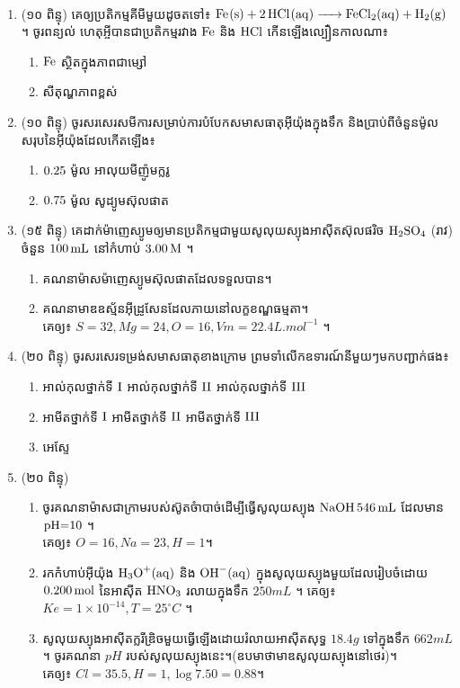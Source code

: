 \documentclass{officialexam}
\begin{document}
{\maketitle}\\
	\begin{enumerate}[I]
		\item {\color{khtug}(១០ ពិន្ទុ)} គេឲ្យប្រតិកម្មគីមីមួយដូចតទៅ៖ $\ce{Fe(s) + 2HCl(aq) -> FeCl2(aq) + H2(g)}$។ ចូរពន្យល់ ហេតុអ្ចីបានជាប្រតិកម្មរវាង $\ce{Fe}$ និង $\ce{HCl}$ កើនឡើងល្បឿនកាលណា៖
		\begin{enumerate}[k,2]
			\item $\ce{Fe}$ ស្ថិតក្នុងភាពជាម្សៅ
			\item សីតុណ្ហភាពខ្ពស់
		\end{enumerate}
		\item {\color{khtug}(១០ ពិន្ទុ)} ចូរសរសេរសមីការសម្រាប់ការបំបែកសមាសធាតុអុីយ៉ុងក្នុងទឹក និងប្រាប់ពីចំនួនម៉ូលសរុបនៃអុីយ៉ុងដែលកើតឡើង៖ 
		\begin{enumerate}[k,2]
			\item $\ce{0.25}$ ម៉ូល អាលុយមីញ៉ូមក្លរូ
			\item $\ce{0.75}$ ម៉ូល សូដ្យូមស៊ុលផាត
		\end{enumerate}
		\item {\color{khtug}(១៥ ពិន្ទុ)} គេដាក់ម៉ាញេស្យូមឲ្យមានប្រតិ​កម្មជាមួយសូលុយស្យុងអាសុីតស៊ុលផរិច $\ce{H2SO4}$ (រាវ) ចំនួន $\ce{100mL}$ នៅកំហាប់ $\ce{3.00M}$ ។
		\begin{enumerate}[k]
			\item គណនាម៉ាសម៉ាញេស្យូមស៊ុលផាតដែលទទួលបាន។
			\item គណនាមាឌឧស្ម័នអុីដ្រូសែនដែលភាយនៅលក្ខខណ្ឌធម្មតា។\\
			គេឲ្យ៖ $S=32,Mg=24,O=16, Vm=22.4L.mol^{-1}$ ។
		\end{enumerate}
		\item {\color{khtug}(២០ ពិន្ទុ)} ចូរសរសេរទម្រង់សមាសធាតុខាងក្រោម ព្រមទាំលើកឧទារណ៍នីមួយៗមកបញ្ជាក់ផង៖
		\begin{enumerate}[k]
			\item អាល់កុលថ្នាក់ទី $\ce{I}$ អាល់កុលថ្នាក់ទី $\ce{II}$ អាល់កុលថ្នាក់ទី $\ce{III}$ 
			\item អាមីតថ្នាក់ទី $\ce{I}$ អាមីតថ្នាក់ទី $\ce{II}$ អាមីតថ្នាក់ទី $\ce{III}$
			\item អេស្ទែ
		\end{enumerate}
		\item  {\color{khtug}(២០ ពិន្ទុ)} \begin{enumerate}[k]
			\item ចូរគណនាម៉ាសជាក្រាមរបស់ស៊ូតចំាបាច់ដើម្បីធ្វើសូលុយស្យុង $\ce{NaOH 546mL}$ ដែលមាន $\ce{pH=10}$ ។\\គេឲ្យ៖ $O=16, Na=23, H=1$។
			\item រកកំហាប់អុីយ៉ុង $\ce{H3O^{+}(aq)}$ និង $\ce{OH^{-}(aq)}$ ក្នុងសូលុយស្យុងមួយដែលរៀបចំដោយ $\ce{0.200mol}$ នៃអាសុីត $\ce{HNO3}$ រលាយក្នុងទឹក $250mL$ ។ គេឲ្យ៖ $Ke=1\times10^{-14}, T=25^\circ C$ ។
			\item សូលុយស្យុងអាសុីតក្លរីឌ្រិចមួយធ្វើឡើងដោយរំលាយអាសុីតសុទ្ធ $18.4g$ ទៅក្នុងទឹក $662mL$ ។ ចូរគណនា $pH$ របស់សូលុយស្យុងនេះ។(ឧបមាថាមាឌសូលុយស្យុងនៅថេរ)។\\
			គេឲ្យ៖ $Cl=35.5, H=1, \log7.50=0.88$។
		\end{enumerate}
	\end{enumerate}
\end{document}
